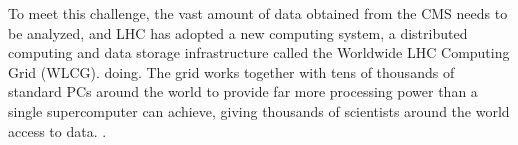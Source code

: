 





To meet this challenge, the vast amount of data obtained from the CMS needs to be analyzed, and LHC has adopted a new computing system, a distributed computing and data storage infrastructure called the Worldwide LHC Computing Grid (WLCG). doing. The grid works together with tens of thousands of standard PCs around the world to provide far more processing power than  a single supercomputer can achieve, giving  thousands of scientists around the world access to data. \cite{CMS_7}.

